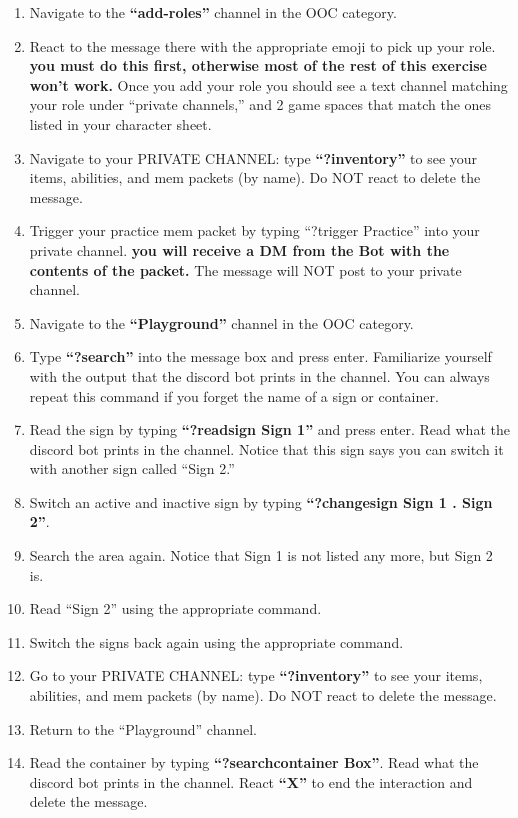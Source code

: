 \documentclass[green]{TMFHope}
\begin{document}
\begin{enumerate}
  \item Navigate to the \textbf{``add-roles''} channel in the OOC category.
  \item React to the message there with the appropriate emoji to pick up your role. \textbf{you must do this first, otherwise most of the rest of this exercise won't work.} Once you add your role you should see a text channel matching your role under ``private channels,'' and 2 game spaces that match the ones listed in your character sheet.
  \item Navigate to your PRIVATE CHANNEL: type \textbf{``?inventory''} to see your items, abilities, and mem packets (by name). Do NOT react to delete the message. 
  \item Trigger your practice mem packet by typing ``?trigger Practice'' into your private channel. \textbf{you will receive a DM from the Bot with the contents of the packet.} The message will NOT post to your private channel.
  \item Navigate to the \textbf{``Playground''} channel in the OOC category.
  \item Type \textbf{``?search''} into the message box and press enter. Familiarize yourself with the output that the discord  bot prints in the channel. You can always repeat this command if you forget the name of a sign or container.
	\item Read the sign by typing \textbf{``?readsign Sign 1''} and press enter. Read what the discord bot prints in the channel. Notice that this sign says you can switch it with another sign called ``Sign 2.''
	\item Switch an active and inactive sign by typing \textbf{``?changesign Sign 1 . Sign 2''}. 
	\item Search the area again. Notice that Sign 1 is not listed any more, but Sign 2 is.
	\item Read ``Sign 2'' using the appropriate command.
	\item Switch the signs back again using the appropriate command.
	\item Go to your PRIVATE CHANNEL: type \textbf{``?inventory''} to see your items, abilities, and mem packets (by name). Do NOT react to delete the message.
	\item Return to the ``Playground'' channel.
	\item Read the container by typing \textbf{``?searchcontainer Box''}. Read what the discord bot prints in the channel. React \textbf{``X''} to end the interaction and delete the message.

\end{enumerate}
\end{document}
